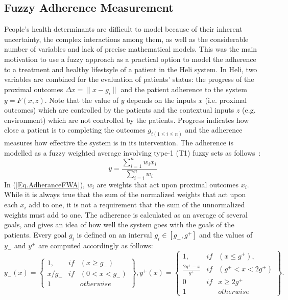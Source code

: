 \documentclass[graybox]{svmult}
\begin{document}
\subsection{Fuzzy  Adherence Measurement}

People's health determinants are difficult to model because of their inherent uncertainty, the complex interactions among them, as well as the considerable number of variables and lack of precise mathematical models. This was the main motivation to use a fuzzy approach as a  practical option to model the adherence to a treatment and healthy lifestsyle of a patient in the Heli system. In Heli, two variables are combined for the evaluation of patients' status: the progress of the proximal outcomes $\Delta x = \|x - g_i\|$  and the patient adherence to the system $y = F(x,z)$. Note that the value of $y$ depends on the inputs $x$ (i.e. proximal outcomes) which are controlled by the patients and the contextual inputs $z$ (e.g. environment) which are not controlled by the patients. Progress indicates how close a patient is to completing the outcomes $g_{i(1\leq i \leq n)}$ and the adherence measures how effective the system is in its intervention. The adherence is modelled as a fuzzy weighted average involving type-1 (T1) fuzzy sets as follows~\cite{Liu2008}:
\begin{equation}
y = \frac{\sum_{i=1}^n w_i x_i}{\sum_{i=i}^n w_i}
\label{Eq.AdheranceFWA}
\end{equation}
In (\ref{Eq.AdheranceFWA}), $w_i$ are weights that act upon proximal outcomes $x_i$. While it is always true that the sum of the normalized weights that act upon each $x_i$ add to one, it is not a requirement that the sum of the unnormalized weights must add to one. The adherence is calculated as an average of several goals, and gives an idea of how well the system goes with the goals of the patients. Every goal $g_i$ is defined on an interval $g_i \in [g_{-}, g^{+}]$ and the values of $y_{-}$ and $y^{+}$ are computed accordingly as follows:
\begin{equation}
 	y_{-}(x)= \left\{ 
	\begin{array}{lcr}
        1,	         & if &(x \geq g_{-})\\
        x/g_{-} 	 & if &(0<x<g_{-})\\
        1                & &otherwise
	\end{array}
	\right \},
 	y^{+}(x)= \left\{ 
	\begin{array}{lcr}
        1,	         & if &(x \leq g^{+}),\\
        \frac{2g^{+}- x}{g^{+} }	 & if &(g^{+}<x<2g^{+} )\\
        0                & if & x \geq 2g^{+}\\
        1                & & otherwise
	\end{array}
	\right \}.
\label{Eq.Adherance}
\end{equation}
\end{document}
